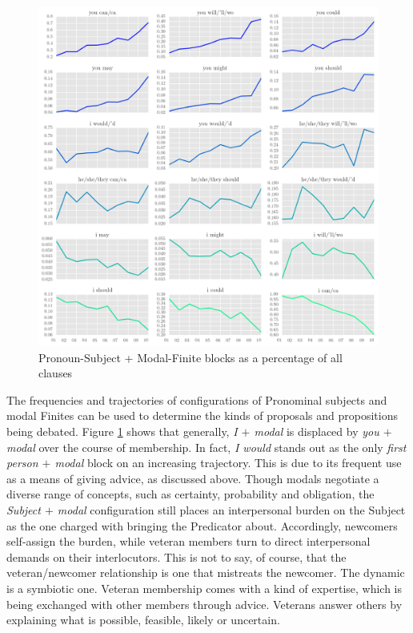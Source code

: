 \begin{figure}
    \centering
    \includegraphics[width=1\textwidth]{../images/subj-fin-const-p-page.png}
    \caption[Pronoun-Subject + Modal-Finite blocks]{Pronoun-Subject + Modal-Finite blocks as a percentage of all clauses}
    \label{fig:modal_constellations}
    \end{figure}%
%
The frequencies and trajectories of configurations of Pronominal subjects and modal Finites can be used to determine the kinds of proposals and propositions being debated. Figure \ref{fig:modal_constellations} shows that generally, \emph{I $+$ modal} is displaced by \emph{you $+$ modal} over the course of membership. In fact, \emph{I would} stands out as the only \emph{first person $+$ modal} block on an increasing trajectory. This is due to its frequent use as a means of giving advice, as discussed above. Though modals negotiate a diverse range of concepts, such as certainty, probability and obligation, the \emph{Subject $+$ modal} configuration still places an interpersonal burden on the Subject as the one charged with bringing the Predicator about. Accordingly, newcomers self\hyp{}assign the burden, while veteran members turn to direct interpersonal demands on their interlocutors. This is not to say, of course, that the veteran\slash newcomer relationship is one that mistreats the newcomer. The dynamic is a symbiotic one. Veteran membership comes with a kind of expertise, which is being exchanged with other  members through advice. Veterans answer others by explaining what is possible, feasible, likely or uncertain.

